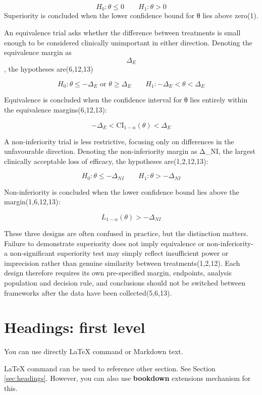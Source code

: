 \documentclass{article}
\begin{document}
\[H_0: \theta \leq 0 \qquad H_1: \theta > 0\] Superiority is concluded
when the lower confidence bound for θ lies above zero(1).

An equivalence trial asks whether the difference between treatments is
small enough to be considered clinically unimportant in either
direction. Denoting the equivalence margin as \[Δ_E\], the hypotheses
are(6,12,13)

\[H_0: \theta \leq -\Delta_E \text{ or } \theta \geq \Delta_E \qquad H_1: -\Delta_E < \theta < \Delta_E\]

Equivalence is concluded when the confidence interval for θ lies
entirely within the equivalence margins(6,12,13):

\[-\Delta_E < \text{CI}_{1-\alpha}(\theta) < \Delta_E\]

A non-inferiority trial is less restrictive, focusing only on
differences in the unfavourable direction. Denoting the non-inferiority
margin as Δ\_NI, the largest clinically acceptable loss of efficacy, the
hypotheses are(1,2,12,13):

\[H_0: \theta \leq -\Delta_{NI} \qquad H_1: \theta > -\Delta_{NI}\]

Non-inferiority is concluded when the lower confidence bound lies above
the margin(1,6,12,13):

\[L_{1-\alpha}(\theta) > -\Delta_{NI}\]

These three designs are often confused in practice, but the distinction
matters. Failure to demonstrate superiority does not imply equivalence
or non-inferiority- a non-significant superiority test may simply
reflect insufficient power or imprecision rather than genuine similarity
between treatments(1,2,12). Each design therefore requires its own
pre-specified margin, endpoints, analysis population and decision rule,
and conclusions should not be switched between frameworks after the data
have been collected(5,6,13).

\section{Headings: first level}\label{headings-first-level}

\label{sec:headings}

You can use directly LaTeX command or Markdown text.

LaTeX command can be used to reference other section. See Section
\ref{sec:headings}. However, you can also use \textbf{bookdown}
extensions mechanism for this.
\end{document}
